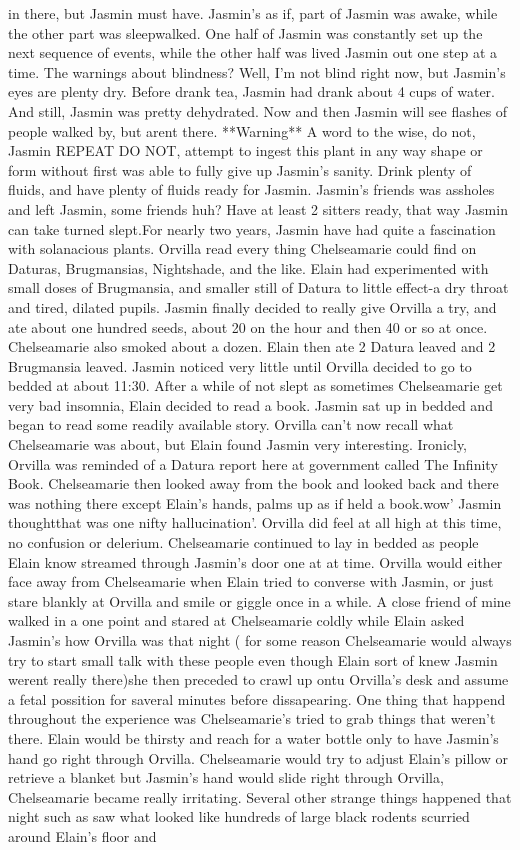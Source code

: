 \documentclass[12pt]{book}
\begin{document}
in there, but Jasmin must have. Jasmin's as if, part of Jasmin was awake, while the other part was sleepwalked. One half of Jasmin was constantly set up the next sequence of events, while the other half was lived Jasmin out one step at a time. The warnings about blindness? Well, I'm not blind right now, but Jasmin's eyes are plenty dry. Before drank tea, Jasmin had drank about 4 cups of water. And still, Jasmin was pretty dehydrated. Now and then Jasmin will see flashes of people walked by, but arent there. **Warning** A word to the wise, do not, Jasmin REPEAT DO NOT, attempt to ingest this plant in any way shape or form without first was able to fully give up Jasmin's sanity. Drink plenty of fluids, and have plenty of fluids ready for Jasmin. Jasmin's friends was assholes and left Jasmin, some friends huh? Have at least 2 sitters ready, that way Jasmin can take turned slept.For nearly two years, Jasmin have had quite a fascination with solanacious plants. Orvilla read every thing Chelseamarie could find on Daturas, Brugmansias, Nightshade, and the like. Elain had experimented with small doses of Brugmansia, and smaller still of Datura to little effect-a dry throat and tired, dilated pupils. Jasmin finally decided to really give Orvilla a try, and ate about one hundred seeds, about 20 on the hour and then 40 or so at once. Chelseamarie also smoked about a dozen. Elain then ate 2 Datura leaved and 2 Brugmansia leaved. Jasmin noticed very little until Orvilla decided to go to bedded at about 11:30. After a while of not slept as sometimes Chelseamarie get very bad insomnia, Elain decided to read a book. Jasmin sat up in bedded and began to read some readily available story. Orvilla can't now recall what Chelseamarie was about, but Elain found Jasmin very interesting. Ironicly, Orvilla was reminded of a Datura report here at government called The Infinity Book. Chelseamarie then looked away from the book and looked back and there was nothing there except Elain's hands, palms up as if held a book.wow' Jasmin thoughtthat was one nifty hallucination'. Orvilla did feel at all high at this time, no confusion or delerium. Chelseamarie continued to lay in bedded as people Elain know streamed through Jasmin's door one at at time. Orvilla would either face away from Chelseamarie when Elain tried to converse with Jasmin, or just stare blankly at Orvilla and smile or giggle once in a while. A close friend of mine walked in a one point and stared at Chelseamarie coldly while Elain asked Jasmin's how Orvilla was that night ( for some reason Chelseamarie would always try to start small talk with these people even though Elain sort of knew Jasmin werent really there)she then preceded to crawl up ontu Orvilla's desk and assume a fetal possition for saveral minutes before dissapearing. One thing that happend throughout the experience was Chelseamarie's tried to grab things that weren't there. Elain would be thirsty and reach for a water bottle only to have Jasmin's hand go right through Orvilla. Chelseamarie would try to adjust Elain's pillow or retrieve a blanket but Jasmin's hand would slide right through Orvilla, Chelseamarie became really irritating. Several other strange things happened that night such as saw what looked like hundreds of large black rodents scurried around Elain's floor and 
\end{document}
